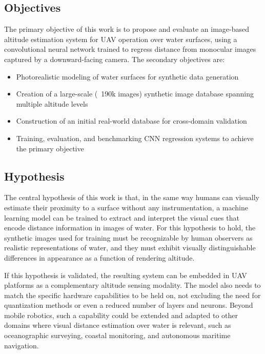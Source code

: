 \subsection{Objectives}

The primary objective of this work is to propose and evaluate an image-based altitude estimation system for UAV operation over water surfaces, using a convolutional neural network trained to regress distance from monocular images captured by a downward-facing camera. The secondary objectives are:

\begin{itemize}
\item Photorealistic modeling of water surfaces for synthetic data generation
\item Creation of a large-scale (~190k images) synthetic image database spanning multiple altitude levels
\item Construction of an initial real-world database for cross-domain validation
\item Training, evaluation, and benchmarking CNN regression systems to achieve the primary objective
\end{itemize}

\subsection{Hypothesis}

The central hypothesis of this work is that, in the same way humans can visually estimate their proximity to a surface without any instrumentation, a machine learning model can be trained to extract and interpret the visual cues that encode distance information in images of water. For this hypothesis to hold, the synthetic images used for training must be recognizable by human observers as realistic representations of water, and they must exhibit visually distinguishable differences in appearance as a function of rendering altitude.

If this hypothesis is validated, the resulting system can be embedded in UAV platforms as a complementary altitude sensing modality. The model also needs to match the specific hardware capabilities to be held on, not excluding the need for quantization methods or even a reduced number of layers and neurons. Beyond mobile robotics, such a capability could be extended and adapted to other domains where visual distance estimation over water is relevant, such as oceanographic surveying, coastal monitoring, and autonomous maritime navigation.

